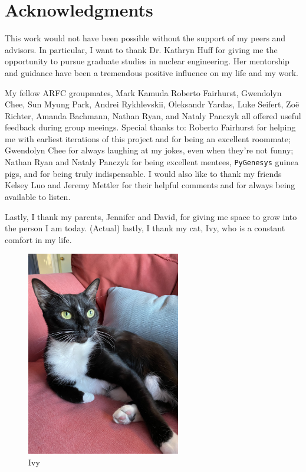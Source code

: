 \documentclass[edeposit,fullpage,11pt]{uiucthesis2018}
\begin{document}
\chapter*{Acknowledgments}

This work would not have been possible without the support of my peers and
advisors. In particular, I want to thank Dr. Kathryn Huff for giving me the
opportunity to pursue graduate studies in nuclear engineering. Her mentorship and
guidance have been a tremendous positive influence on my life and my work.

My fellow ARFC groupmates, Mark Kamuda Roberto Fairhurst, Gwendolyn Chee,
Sun Myung Park, Andrei Rykhlevskii, Oleksandr Yardas, Luke Seifert, Zo\"e Richter,
Amanda Bachmann, Nathan Ryan, and Nataly Panczyk all offered useful feedback
during group meeings. Special thanks to: Roberto Fairhurst for helping me with
earliest iterations of this project and for being an excellent roommate; Gwendolyn
Chee for always laughing at my jokes, even when they're not funny; Nathan Ryan
and Nataly Panczyk for being excellent mentees, \texttt{PyGenesys} guinea pigs,
and for being truly indispensable.
I would also like to thank my friends Kelsey Luo and Jeremy Mettler for their
helpful comments and for always being available to listen.

Lastly, I thank my parents, Jennifer and David, for giving me space to grow
into the person I am today. (Actual) lastly, I thank my cat, Ivy, who is a
constant comfort in my life.

\begin{figure}[H]
  \centering
  \includegraphics[width=0.6\textwidth]{figures/ivy}
  \caption{Ivy}
  \label{fig:ivy}
\end{figure}
\end{document}
